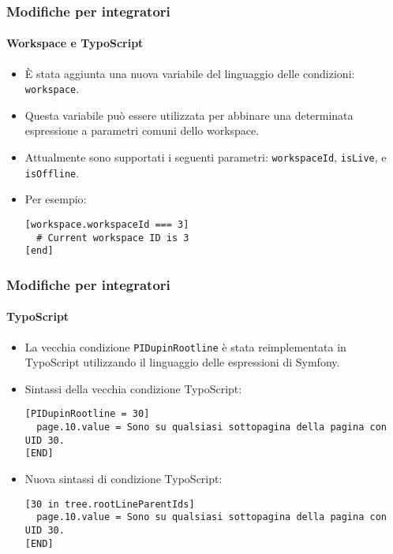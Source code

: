 \begin{frame}[fragile]
	\frametitle{Modifiche per integratori}
	\framesubtitle{Workspace e TypoScript}

	\lstset{basicstyle=\smaller\ttfamily}

	\begin{itemize}
		\item È stata aggiunta una nuova variabile del linguaggio delle condizioni: \texttt{workspace}.
		\item Questa variabile può essere utilizzata per abbinare una determinata espressione a parametri comuni dello workspace.
		\item Attualmente sono supportati i seguenti parametri:\newline
			\small
				\texttt{workspaceId}, \texttt{isLive}, e \texttt{isOffline}.
			\normalsize
		\item Per esempio:

\vspace{-0.4cm}
\begin{lstlisting}
[workspace.workspaceId === 3]
  # Current workspace ID is 3
[end]
\end{lstlisting}

	\end{itemize}

\end{frame}


\begin{frame}[fragile]
	\frametitle{Modifiche per integratori}
	\framesubtitle{TypoScript}

	\lstset{basicstyle=\smaller\ttfamily}

	\begin{itemize}
		\item La vecchia condizione \texttt{PIDupinRootline} è stata reimplementata
			in TypoScript utilizzando il linguaggio delle espressioni di Symfony.
		\item Sintassi della vecchia condizione TypoScript:

\vspace{-0.4cm}
\begin{lstlisting}
[PIDupinRootline = 30]
  page.10.value = Sono su qualsiasi sottopagina della pagina con UID 30.
[END]
\end{lstlisting}

		\item Nuova sintassi di condizione TypoScript:

\vspace{-0.4cm}
\begin{lstlisting}
[30 in tree.rootLineParentIds]
  page.10.value = Sono su qualsiasi sottopagina della pagina con UID 30.
[END]
\end{lstlisting}

	\end{itemize}

\end{frame}

